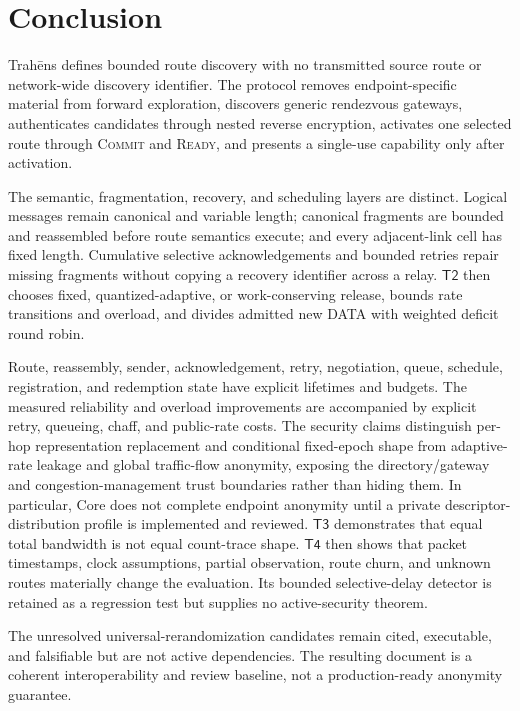 \documentclass[11pt,oneside]{article}
\newcommand{\ProtoName}{Trah\={e}ns}
\newcommand{\Ttwo}{\ensuremath{\mathsf{T2}}}
\newcommand{\Tthree}{\ensuremath{\mathsf{T3}}}
\newcommand{\Tfour}{\ensuremath{\mathsf{T4}}}
\begin{document}
\section{Conclusion}
\label{sec:conclusion}

\ProtoName{} defines bounded route discovery with no transmitted source route or network-wide discovery identifier. The protocol removes endpoint-specific material from forward exploration, discovers generic rendezvous gateways, authenticates candidates through nested reverse encryption, activates one selected route through \textsc{Commit} and \textsc{Ready}, and presents a single-use capability only after activation.

The semantic, fragmentation, recovery, and scheduling layers are distinct. Logical messages remain canonical and variable length; canonical fragments are bounded and reassembled before route semantics execute; and every adjacent-link cell has fixed length. Cumulative selective acknowledgements and bounded retries repair missing fragments without copying a recovery identifier across a relay. \Ttwo{} then chooses fixed, quantized-adaptive, or work-conserving release, bounds rate transitions and overload, and divides admitted new DATA with weighted deficit round robin.

Route, reassembly, sender, acknowledgement, retry, negotiation, queue, schedule, registration, and redemption state have explicit lifetimes and budgets. The measured reliability and overload improvements are accompanied by explicit retry, queueing, chaff, and public-rate costs. The security claims distinguish per-hop representation replacement and conditional fixed-epoch shape from adaptive-rate leakage and global traffic-flow anonymity, exposing the directory/gateway and congestion-management trust boundaries rather than hiding them. In particular, Core does not complete endpoint anonymity until a private descriptor-distribution profile is implemented and reviewed. \Tthree{} demonstrates that equal total bandwidth is not equal count-trace shape. \Tfour{} then shows that packet timestamps, clock assumptions, partial observation, route churn, and unknown routes materially change the evaluation. Its bounded selective-delay detector is retained as a regression test but supplies no active-security theorem.

The unresolved universal-rerandomization candidates remain cited, executable, and falsifiable but are not active dependencies. The resulting document is a coherent interoperability and review baseline, not a production-ready anonymity guarantee.
\end{document}
